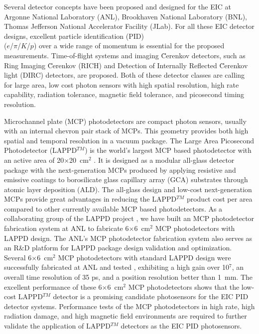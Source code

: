 \documentclass[preprint,5p]{elsarticle}
\begin{document}
Several detector concepts have been proposed and designed for the EIC at 
Argonne National Laboratory (ANL), Brookhaven National Laboratory (BNL), Thomas 
Jefferson National Accelerator Facility (JLab). For all these EIC detector 
designs, excellent particle identification (PID)\\ ($e$/$\pi$/$K$/$p$) over a 
wide range of momentum is essential for the proposed measurements.  
Time-of-flight systems and imaging \u Cerenkov detectors, such as Ring Imaging 
\u Cerenkov (RICH) \cite{RICH,RICH2} and Detection of Internally Reflected \u 
Cerenkov light (DIRC) \cite{DRIC} detectors, are proposed. Both of these 
detector classes are calling for large area, low cost photon sensors with high 
spatial resolution, high rate capability, radiation tolerance, magnetic field 
tolerance, and picosecond timing resolution. 

Microchannel plate (MCP) photodetectors are compact photon sensors, usually 
with an internal chevron pair stack of MCPs. This  geometry provides both high 
spatial and temporal resolution in a vacuum package. The Large Area Picosecond 
Photodetector (LAPPD$^{TM}$) is the world's largest MCP based photodetector 
with an active area of 20$\times$20~cm$^2$ \cite{LAPPD}. It is designed as a 
modular all-glass detector package with the next-generation MCPs produced by 
applying resistive and emissive coatings to borosilicate glass capillary array 
(GCA) substrates through atomic layer deposition (ALD). The all-glass design 
and low-cost next-generation MCPs provide great advantages in reducing the 
LAPPD$^{TM}$ product cost per area compared to other currently available MCP 
based photodetectors. As a collaborating group of the LAPPD project 
\cite{LAPPD2}, we have built an MCP photodetector fabrication system 
\cite{LAPPD-ANL} at ANL to fabricate 6$\times$6~cm$^2$ MCP photodetectors with 
LAPPD design. The ANL's MCP photodetector fabrication system also serves as an 
R{\&}D platform for LAPPD package design validation and optimization.  Several 
6$\times$6~cm$^2$ MCP photodetectors with standard LAPPD design were 
successfully fabricated at ANL and tested \cite{ANL-MCPs,Wang-MCPs,Wang-MCPs2}, 
exhibiting a high gain over 10$^7$, an overall time resolution of 35 ps, and a 
position resolution better than 1~mm. The excellent performance of these 
6$\times$6~cm$^2$ MCP photodetectors shows that the low-cost LAPPD$^{TM}$ 
detector is a promising candidate photosensors for the EIC PID detector 
systems. Performance tests of the MCP photodetectors in high rate, high 
radiation damage, and high magnetic field environments are required to further 
validate the application of LAPPD$^{TM}$ detectors as the EIC PID photosensors. 
\end{document}
